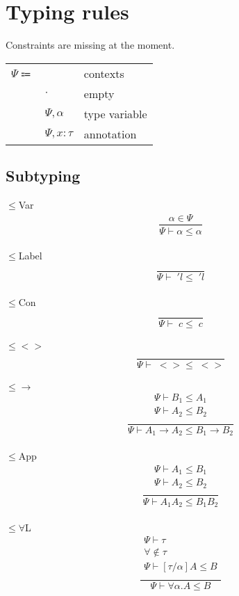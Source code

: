 \documentclass[12pt]{article}
\begin{document}
\newpage
\section{Typing rules}
Constraints are missing at the moment.\\

\begin{tabular}{l l l}
	$\Psi \Coloneqq$ & & contexts \\
		& $\cdot$ & empty \\
		& $\Psi , \alpha$ & type variable \\
		& $\Psi , x : \tau$ & annotation \\
\end{tabular}

\subsection{Subtyping}
$\leq$Var \[\frac{
	\begin{array}{c}
	\alpha \in \Psi
	\end{array}
}{
	\Psi \vdash \alpha \leq \alpha
}\]\\
$\leq$Label \[\frac{
	\begin{array}{c}
	\end{array}
}{
	\Psi \vdash \; 'l \leq \; 'l
}\]\\
$\leq$Con \[\frac{
	\begin{array}{c}
	\end{array}
}{
	\Psi \vdash \; c \leq \; c
}\]\\
$\leq<>$ \[\frac{
	\begin{array}{c}
	\end{array}
}{
	\Psi \vdash \; <> \leq \; <>
}\]\\
$\leq\rightarrow$ \[\frac{
	\begin{array}{c}
	\Psi \vdash B_1 \leq A_1 \\
	\Psi \vdash A_2 \leq B_2 \\
	\end{array}
}{
	\Psi \vdash A_1 \rightarrow A_2 \leq B_1 \rightarrow B_2
}\]\\
$\leq$App \[\frac{
	\begin{array}{c}
	\Psi \vdash A_1 \leq B_1 \\
	\Psi \vdash A_2 \leq B_2 \\
	\end{array}
}{
	\Psi \vdash A_1 A_2 \leq B_1 B_2
}\]\\
$\leq\forall$L \[\frac{
	\begin{array}{c}
	\Psi \vdash \tau \\
	\forall \notin \tau \\
	\Psi \vdash [\tau / \alpha]A \leq B \\
	\end{array}
}{
	\Psi \vdash \forall \alpha . A \leq B
}\]\\
\end{document}
